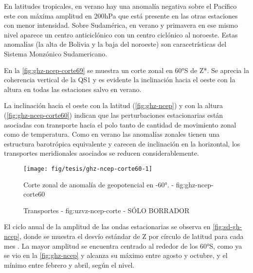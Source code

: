 \documentclass[spanish,a4paper]{book}
\begin{document}
En latitudes tropicales, en verano hay una anomalía negativa sobre el
Pacífico este con máxima amplitud en 200hPa que está presente en las
otras estaciones con menor intensidad. Sobre Sudamérica, en verano y
primavera en ese mismo nivel aparece un centro anticiclónico con un
centro ciclónico al noroeste. Estas anomalías (la alta de Bolivia y la
baja del noroeste) son caracetrísticas del Sistema Monzónico
Sudamericano.

En la \autoref{fig:ghz-ncep-corte69} se muestra un corte zonal en 60°S
de Z*. Se aprecia la coherencia vertical de la QS1 y es evidente la
inclinación hacia el oeste con la altura en todas las estaciones salvo
en verano.

La inclinación hacia el oeste con la latitud (\autoref{fig:ghz-ncep}) y
con la altura (\autoref{fig:ghz-ncep-corte60}) indican que las
perturbaciones estacionarias están asociadas con transporte hacia el
polo tanto de cantidad de movimiento zonal como de temperatura. Como en
verano las anomalías zonales tienen una estructura barotrópica
equivalente y carecen de inclinación en la horizontal, los transportes
meridionales asociados se reducen considerablemente. 

\begin{figure}

{\centering \texttt{[image: fig/tesis/ghz-ncep-corte60-1]} 

}

\caption{Corte zonal de anomalía de geopotencial en -60°. - fig:ghz-ncep-corte60}\label{fig:ghz-ncep-corte60}
\end{figure}

\begin{figure}
\newline{}\caption{Transportes - fig:uzvz-ncep-corte - SÓLO BORRADOR}\label{fig:uzvz-ncep-corte}
\end{figure}

El ciclo anual de la amplitud de las ondas estacionarias se observa en
\autoref{fig:sd-gh-ncep}, donde se muestra el desvío estándar de Z por
círculo de latitud para cada mes
. La
mayor amplitud se encuentra centrado al rededor de los 60°S, como ya se
vio en la \autoref{fig:ghz-ncep} y alcanza su máximo entre agosto y
octubre, y el mínimo entre febrero y abril, según el nivel.
\end{document}
